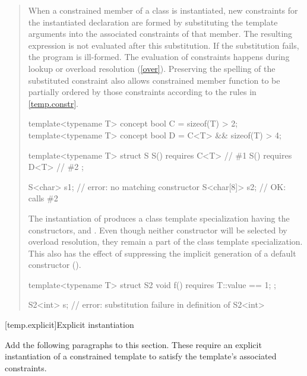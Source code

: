\begin{quote}
\setcounter{Paras}{1}
\pnum
When a constrained member of a class is instantiated, new constraints
for the instantiated declaration are formed by substituting the
template arguments into the associated constraints of that member.
The resulting expression is not evaluated after this substitution.
% 
If the substitution fails, the program is ill-formed.
% 
\enternote
The evaluation of constraints happens during lookup or overload
resolution (\ref{over}). Preserving the spelling
of the substituted constraint also allows constrained member function
to be partially ordered by those constraints according to the rules
in \ref{temp.constr}.
\exitnote
% 
\enterexample
\begin{codeblock}
template<typename T> concept bool C = sizeof(T) > 2;
template<typename T> concept bool D = C<T> && sizeof(T) > 4;

template<typename T> struct S {
  S() requires C<T> { } // \#1
  S() requires D<T> { } // \#2
};

S<char> s1;    // error: no matching constructor
S<char[8]> s2; // OK: calls \#2
\end{codeblock}
The instantiation of  produces a class
template specialization having the constructors, 
 and
.
% 
Even though neither constructor will be selected by overload resolution,
they remain a part of the class template specialization. This also
has the effect of suppressing the implicit generation of a default 
constructor ().
% 
\begin{codeblock}
template<typename T> struct S2 {
    void f() requires T::value == 1;
  };

S2<int> s; // error: substitution failure in definition of S2<int>
\end{codeblock}
\exitexample
\end{quote}    


[temp.explicit]{Explicit instantiation}

Add the following paragraphs to this section. These require an explicit
instantiation of a constrained template to satisfy the template's
associated constraints.

